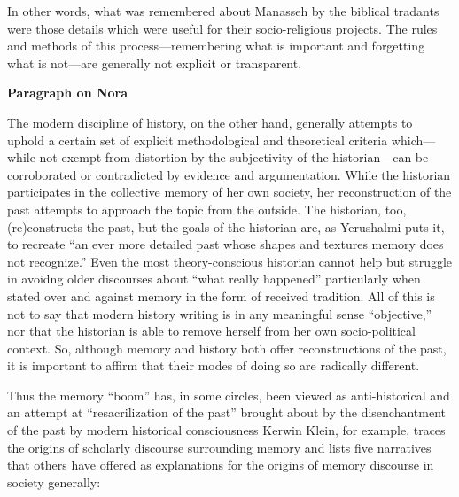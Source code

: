 In other words, what was remembered about Manasseh by the biblical
tradants were those details which were useful for their socio-religious
projects. The rules and methods of this process---remembering what is
important and forgetting what is not---are generally not explicit or
transparent.

\textbf{Paragraph on Nora}

The modern discipline of history, on the other hand, generally attempts
to uphold a certain set of explicit methodological and theoretical
criteria which---while not exempt from distortion by the subjectivity of
the historian---can be corroborated or contradicted by evidence and
argumentation.\autocite[As Daniel Pioske puts it, ``What separates the
act of historiography from the recounting of a culture's sanctioned
memories is consequently the historians' determination to isolate and
compare disparate testimonies about the past with other past traces that
ma corroborate or discredit their
claims.''][302--303]{pioske_bibint2015} While the historian participates
in the collective memory of her own society, her reconstruction of the
past attempts to approach the topic from the outside. The historian,
too, (re)constructs the past, but the goals of the historian are, as
Yerushalmi puts it, to recreate ``an ever more detailed past whose
shapes and textures memory does not
recognize.''\autocites[94]{yerushalmi1989}[See
also][532]{verovsek_pgi2016} Even the most theory-conscious historian
cannot help but struggle in avoidng older discourses about ``what really
happened'' particularly when stated over and against memory in the form
of received tradition. All of this is not to say that modern history
writing is in any meaningful sense ``objective,'' nor that the historian
is able to remove herself from her own socio-political context. So,
although memory and history both offer reconstructions of the past, it
is important to affirm that their modes of doing so are radically
different.\autocite[Pioske observes, ``The epistemological tension
observed by Ricoeur between memory and history is thus understood as the
outcome of two processes that, though having the similar intent of
re-presenting former phenomena, nevertheless pursue and mediate the past
through quite disparate means.''][302]{pioske_bibint2015}

Thus the memory ``boom'' has, in some circles, been viewed as
anti-historical and an attempt at ``resacrilization of the past''
brought about by the disenchantment of the past by modern historical
consciousness\autocite[282]{winter2006} Kerwin Klein, for example,
traces the origins of scholarly discourse surrounding memory and lists
five narratives that others have offered as explanations for the origins
of memory discourse in society generally:

